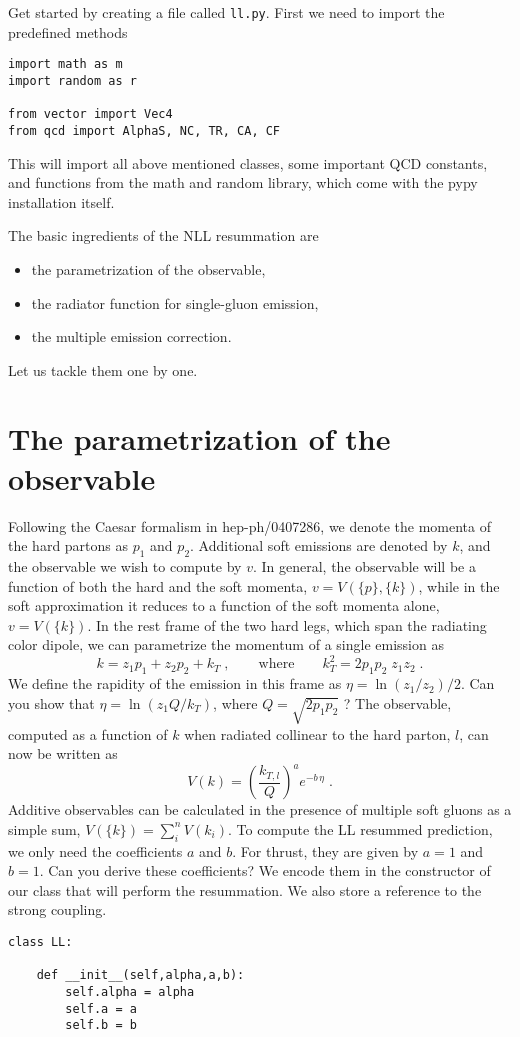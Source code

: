 \documentclass[10pt,fleqn]{scrartcl}
\begin{document}
Get started by creating a file called {\tt ll.py}.
First we need to import the predefined methods
\begin{verbatim}
import math as m
import random as r

from vector import Vec4
from qcd import AlphaS, NC, TR, CA, CF
\end{verbatim}
This will import all above mentioned classes, some important QCD constants,
and functions from the math and random library, which come with the pypy
installation itself.

The basic ingredients of the NLL resummation are
\begin{itemize}
\item the parametrization of the observable,
\item the radiator function for single-gluon emission,
\item the multiple emission correction.
\end{itemize}
Let us tackle them one by one.

\section{The parametrization of the observable}
Following the Caesar formalism in hep-ph/0407286, we denote the momenta of the
hard partons as $p_1$ and $p_2$. Additional soft emissions are denoted by $k$,
and the observable we wish to compute by $v$. In general, the observable will be
a function of both the hard and the soft momenta, $v=V(\{p\},\{k\})$, while in the
soft approximation it reduces to a function of the soft momenta alone, $v=V(\{k\})$.
In the rest frame of the two hard legs, which span the radiating color dipole,
we can  parametrize the momentum of a single emission as
\begin{equation}\label{eq:sudakov_decomposition}
  k=z_{1} p_1+z_{2} p_2+k_{T}\;,
  \qquad\text{where}\qquad
  k_{T}^2=2p_1p_2\;z_{1}z_{2}\;.
\end{equation}
We define the rapidity of the emission in this frame as $\eta=\ln(z_{1}/z_{2})/2$.
Can you show that $\eta=\ln(z_{1}Q/k_T)$, where $Q=\sqrt{2p_1p_2}$ ?
The observable, computed as a function of $k$ when radiated collinear
to the hard parton, $l$, can now be written as
\begin{equation}\label{eq:V_approx}
  V(k) = \left(\frac{k_{T,l}}{Q}\right)^a e^{-b\,\eta}\;.
\end{equation}
Additive observables can be calculated in the presence of multiple soft gluons
as a simple sum, $V(\{k\}) = \sum_i^n V(k_i)$. To compute the LL resummed
prediction, we only need the coefficients $a$ and $b$. For thrust, they are
given by $a=1$ and $b=1$. Can you derive these coefficients?
We encode them in the constructor of our class that will perform the resummation.
We also store a reference to the strong coupling.
\begin{verbatim}
class LL:

    def __init__(self,alpha,a,b):
        self.alpha = alpha
        self.a = a
        self.b = b

\end{verbatim}
\end{document}
